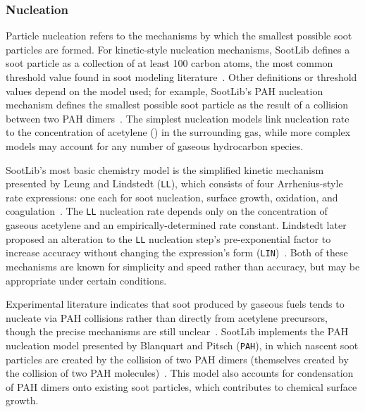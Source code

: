 \documentclass[preprint,letterpaper]{elsarticle}
\begin{document}
\begin{table}
{\begin{tabular}{l l l l l}
            \hline
        \end{tabular}
    }
\end{table}

\subsubsection{Nucleation}
\label{sss:nuc}

Particle nucleation refers to the mechanisms by which the smallest possible soot particles are formed. For kinetic-style nucleation mechanisms, SootLib defines a soot particle as a collection of at least 100 carbon atoms, the most common threshold value found in soot modeling literature~\cite{Leung_1991}. Other definitions or threshold values depend on the model used; for example, SootLib's PAH nucleation mechanism defines the smallest possible soot particle as the result of a collision between two PAH dimers~\cite{Blanquart_2009c}. The simplest nucleation models link nucleation rate to the concentration of acetylene () in the surrounding gas, while more complex models may account for any number of gaseous hydrocarbon species.

SootLib's most basic chemistry model is the simplified kinetic mechanism presented by Leung and Lindstedt (\texttt{LL}), which consists of four Arrhenius-style rate expressions: one each for soot nucleation, surface growth, oxidation, and coagulation~\cite{Leung_1991}. The \texttt{LL} nucleation rate depends only on the concentration of gaseous acetylene and an empirically-determined rate constant. Lindstedt later proposed an alteration to the \texttt{LL} nucleation step's pre-exponential factor to increase accuracy without changing the expression's form (\texttt{LIN})~\cite{Lindstedt_2005}. Both of these mechanisms are known for simplicity and speed rather than accuracy, but may be appropriate under certain conditions.

Experimental literature indicates that soot produced by gaseous fuels tends to nucleate via PAH collisions rather than directly from acetylene precursors, though the precise mechanisms are still unclear~\cite{Wang_2011}. SootLib implements the PAH nucleation model presented by Blanquart and Pitsch (\texttt{PAH}), in which nascent soot particles are created by the collision of two PAH dimers (themselves created by the collision of two PAH molecules)~\cite{Blanquart_2009c}. This model also accounts for condensation of PAH dimers onto existing soot particles, which contributes to chemical surface growth.
\end{document}
